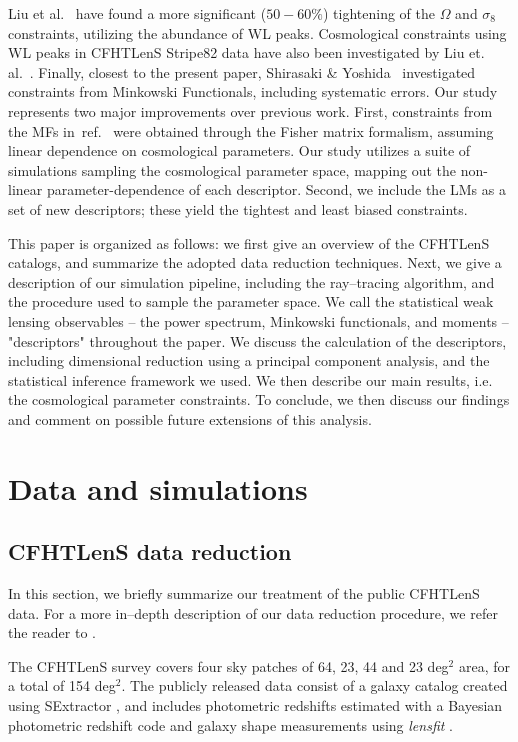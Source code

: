 \documentclass[reprint,aps,prd,superscriptaddress,showkeys,showpacs]{revtex4-1}
\begin{document}
Liu et al.~\citep{Companion} have found a more significant ($50-60\%$)
tightening of the $\Omega$ and $\sigma_8$ constraints, utilizing the
abundance of WL peaks. Cosmological constraints using WL peaks in CFHTLenS Stripe82 data
have also been investigated by Liu et. al.~\citep{Stripe82}. 
Finally, closest to the present paper, Shirasaki \&
Yoshida~\citep{CFHTMasato} investigated constraints from Minkowski
Functionals, including systematic errors.  Our study represents two
major improvements over previous work.  First, constraints from the
MFs in~ref.~\citep{CFHTMasato} were obtained through the Fisher matrix
formalism, assuming linear dependence on cosmological parameters. Our
study utilizes a suite of simulations sampling the cosmological
parameter space, mapping out the non-linear parameter-dependence of
each descriptor.  Second, we include the LMs as a set of new
descriptors; these yield the tightest and least biased constraints.


This paper is organized as follows: we first give an overview of the
CFHTLenS catalogs, and summarize the adopted data reduction
techniques. Next, we give a description of our simulation pipeline,
including the ray--tracing algorithm, and the procedure used to sample
the parameter space. We call the statistical weak lensing observables
-- the power spectrum, Minkowski functionals, and moments --
"descriptors" throughout the paper. We discuss the calculation of the
descriptors, including dimensional reduction using a principal
component analysis, and the statistical inference framework we
used. We then describe our main results, i.e. the cosmological
parameter constraints. To conclude, we then discuss our findings and
comment on possible future extensions of this analysis.


\section{Data and simulations}

\subsection{CFHTLenS data reduction}
\label{cfhtdatareduction}

In this section, we briefly summarize our treatment of the public
CFHTLenS data.  For a more in--depth description of our data reduction
procedure, we refer the reader to \citep{Companion}.

The CFHTLenS survey covers four sky patches of 64, 23, 44 and 23
deg$^2$ area, for a total of 154 deg$^2$. The publicly released data
consist of a galaxy catalog created using SExtractor
\citep{SExtractor}, and includes photometric redshifts estimated with
a Bayesian photometric redshift code \citep{PhotoCode} and galaxy
shape measurements using \textit{lensfit} \citep{cfht1,cfht2}.
\end{document}
